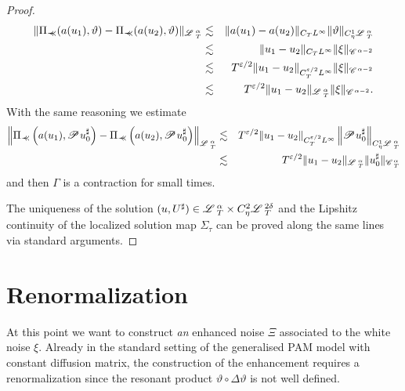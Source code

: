 \documentclass[11pt,reqno]{amsart}
\newcommand{\precprec}{\prec\!\!\!\prec}
\newcommand{\tmtextit}[1]{{\itshape{#1}}}
\newcommand{\CC}{\mathscr{C} \hspace{.1em}}
\newcommand{\LL}{\mathscr{L} \hspace{.2em}}
\newcommand{\PP}{\mathscr{P} \hspace{.1em}}
\begin{document}
\begin{proof}
  \begin{eqnarray*}
    \| \Pi_{\precprec} (a (u_1), \vartheta) - \Pi_{\precprec} (a (u_2),
    \vartheta) \|_{\LL^{\alpha}_T} & \lesssim & \| a (u_1) - a (u_2) \|_{C_T
    L^{\infty}} \| \vartheta \|_{C_{\eta}^1 \LL^{\alpha}_T}\\
    & \lesssim & \| u_1 - u_2 \|_{C_T L^{\infty}} \| \xi \|_{\CC^{\alpha -
    2}}\\
    & \lesssim & T^{\varepsilon / 2}  \| u_1 - u_2 \|_{C_T^{\varepsilon / 2}
    L^{\infty}} \| \xi \|_{\CC^{\alpha - 2}} \\
    & \lesssim & T^{\varepsilon / 2} \| u_1 - u_2 \|_{\LL^{\alpha}_T} \| \xi
    \|_{\CC^{\alpha - 2}} .
  \end{eqnarray*}
  With the same reasoning we estimate
  \begin{eqnarray*}
    \left\| \Pi_{\precprec} \left( a (u_1), \PP u^{\sharp}_0 \right) -
    \Pi_{\precprec} \left( a (u_2), \PP u^{\sharp}_0 \right)
    \right\|_{\LL^{\alpha}_T} & \lesssim & T^{\varepsilon / 2} \| u_1 - u_2
    \|_{C^{\varepsilon / 2}_T L^{\infty}} \left\| \PP u^{\sharp}_0
    \right\|_{C_{\eta}^1 \LL^{\alpha}_T}\\
    & \lesssim & T^{\varepsilon / 2} \| u_1 - u_2 \|_{\LL^{\alpha}_T} \|
    u^{\sharp}_0 \|_{\CC^{\alpha}_T}
  \end{eqnarray*}
  and then $\Gamma$ is a contraction for small times.
  
  The uniqueness of the solution $(u, U^{\sharp}) \in \LL^{\alpha}_T \times
  C_{\eta}^2 \LL^{2 \delta}_T$ and the Lipshitz continuity of the localized
  solution map $\Sigma_{\tau}$ can be proved along the same lines via standard
  arguments.
\end{proof}

\section{Renormalization\label{s:renorm}}

At this point we want to construct \tmtextit{an} enhanced noise $\Xi$
associated to the white noise $\xi$. Already in the standard setting of the
generalised PAM model with constant diffusion matrix, the construction of the
enhancement requires a renormalization since the resonant product $\vartheta
\circ \Delta \vartheta$ is not well defined.
\end{document}
